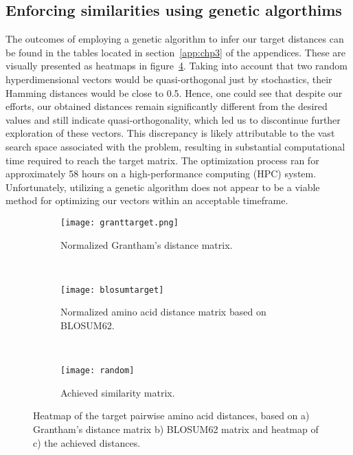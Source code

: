 \subsection*{Enforcing similarities using genetic algorthims}
The outcomes of employing a genetic algorithm to infer our target distances can be found in the tables located in section~\ref{app:chp3} of the appendices. These are visually presented as heatmaps in figure~\ref{fig:ga}. Taking into account that two random hyperdimensional vectors would be quasi-orthogonal just by stochastics, their Hamming distances would be close to 0.5. Hence, one could see that despite our efforts, our obtained distances remain significantly different from the desired values and still indicate quasi-orthogonality, which led us to discontinue further exploration of these vectors. This discrepancy is likely attributable to the vast search space associated with the problem, resulting in substantial computational time required to reach the target matrix. The optimization process ran for approximately 58 hours on a high-performance computing (HPC) system. Unfortunately, utilizing a genetic algorithm does not appear to be a viable method for optimizing our vectors within an acceptable timeframe.

\begin{figure}[H]
    \centering
    \begin{minipage}[b]{.5\textwidth}
    \begin{subfigure}[b]{\textwidth}
        \texttt{[image: granttarget.png]}
        \caption{Normalized Grantham's distance matrix.}
        \label{fig:grant}
    \end{subfigure}
\end{minipage}
\\
\centering
    \begin{minipage}[b]{.5\textwidth}
    \begin{subfigure}[b]{\textwidth}
        \texttt{[image: blosumtarget]}
        \caption{Normalized amino acid distance matrix based on BLOSUM62.}
        \label{fig:blosum}
    \end{subfigure}
    \end{minipage}
\\
\centering
    \begin{minipage}[b]{.5\textwidth}
    \begin{subfigure}[b]{\textwidth}
        \texttt{[image: random]}
        \caption{Achieved similarity matrix.}
        \label{fig:random}
    \end{subfigure}
    \end{minipage}
    \caption{Heatmap of the target pairwise amino acid distances, based on a) Grantham's distance matrix b) BLOSUM62 matrix and heatmap of c) the achieved distances.}
    \label{fig:ga}
\end{figure}
